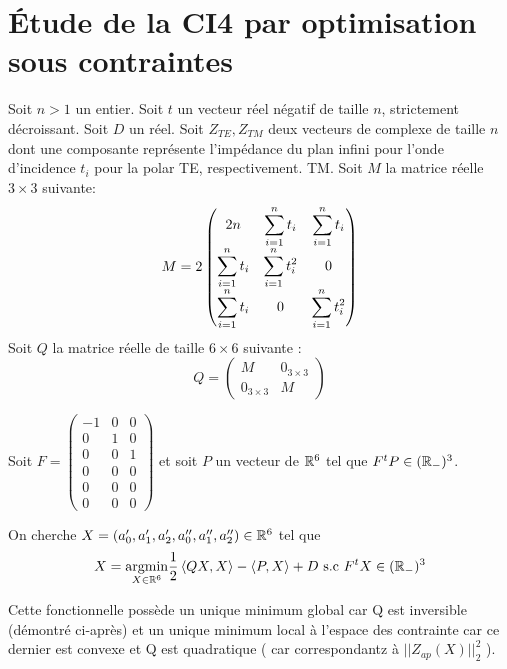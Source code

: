\section{Étude de la CI4 par optimisation sous contraintes}

\newcommand{\st}{\ds\sum_{i=1}^n t_i}
\newcommand{\stc}{\ds\sum_{i=1}^n t_i^2 }
\newcommand{\mma}{\frac{\left(\st\right)^2 - 2n \stc}{\stc}}
\newcommand{\mmb}{\frac{\left(\st\right)^2}{\stc}}
Soit $n>1$ un entier.
Soit $t$ un vecteur réel négatif de taille $n$, strictement décroissant. Soit $D$ un réel.
Soit $Z_{TE}, Z_{TM}$ deux vecteurs de complexe de taille $n$ dont une composante représente l'impédance du plan infini pour l'onde d'incidence $t_i$ pour la polar TE, respectivement. TM.
Soit $M$ la matrice réelle $3\times3$ suivante:
\[
M = 2\begin{pmatrix}
2n & \st & \st \\
\st & \stc & 0 \\
\st & 0 & \stc
\end{pmatrix}
\]
Soit $Q$ la matrice réelle de taille $6 \times 6$ suivante :
\[
Q = \begin{pmatrix}
M & 0_{3 \times 3} \\
0_{3 \times 3} & M
\end{pmatrix}
\]

Soit $F = \begin{pmatrix}
-1 & 0 & 0 \\
0 & 1 & 0 \\
0 & 0 & 1 \\
0 & 0 & 0 \\
0 & 0 & 0 \\
0 & 0 & 0 
\end{pmatrix}$ et soit $P$ un vecteur de $\mathbb R^6$ tel que $ F^tP  \in (\mathbb R_-)^3$.

On cherche $X=(a_0', a_1', a_2',a_0'',a_1'',a_2'') \in \mathbb R^6$ tel que
\begin{align}
X = {\underset{X\in \mathbb R^6}{\operatorname{argmin}}} \dfrac{1}{2}\left<QX,X\right> - \left<P,X\right> + D \text{ s.c } F^tX \in (\mathbb R_-)^3
\end{align}

Cette fonctionnelle possède un unique minimum global car Q est inversible (démontré ci-après) et un unique minimum local à l'espace des contrainte car ce dernier est convexe et  Q est quadratique ( car correspondantz à $|| Z_{ap}(X)||_2^2$ ).

